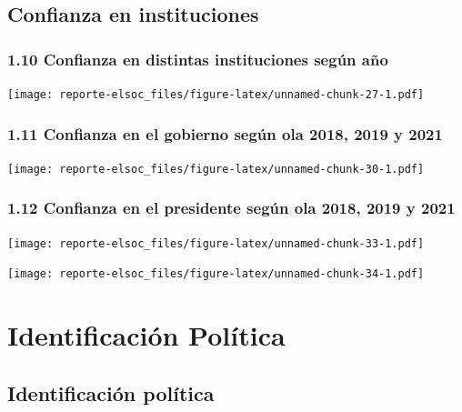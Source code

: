 \documentclass[
  12pt,
  openany]{book}
\begin{document}
\hypertarget{confianza-en-instituciones}{%
\section{Confianza en instituciones}\label{confianza-en-instituciones}}

\hypertarget{confianza-en-distintas-instituciones-seguxfan-auxf1o}{%
\subsection{1.10 Confianza en distintas instituciones según año}\label{confianza-en-distintas-instituciones-seguxfan-auxf1o}}

\texttt{[image: reporte-elsoc\_files/figure-latex/unnamed-chunk-27-1.pdf]}

\hypertarget{confianza-en-el-gobierno-seguxfan-ola-2018-2019-y-2021}{%
\subsection{1.11 Confianza en el gobierno según ola 2018, 2019 y 2021}\label{confianza-en-el-gobierno-seguxfan-ola-2018-2019-y-2021}}

\texttt{[image: reporte-elsoc\_files/figure-latex/unnamed-chunk-30-1.pdf]}

\hypertarget{confianza-en-el-presidente-seguxfan-ola-2018-2019-y-2021}{%
\subsection{1.12 Confianza en el presidente según ola 2018, 2019 y 2021}\label{confianza-en-el-presidente-seguxfan-ola-2018-2019-y-2021}}

\texttt{[image: reporte-elsoc\_files/figure-latex/unnamed-chunk-33-1.pdf]}

\texttt{[image: reporte-elsoc\_files/figure-latex/unnamed-chunk-34-1.pdf]}

\hypertarget{identificaciuxf3n-poluxedtica}{%
\chapter{Identificación Política}\label{identificaciuxf3n-poluxedtica}}

\hypertarget{identificaciuxf3n-poluxedtica-1}{%
\section{Identificación política}\label{identificaciuxf3n-poluxedtica-1}}
\end{document}
